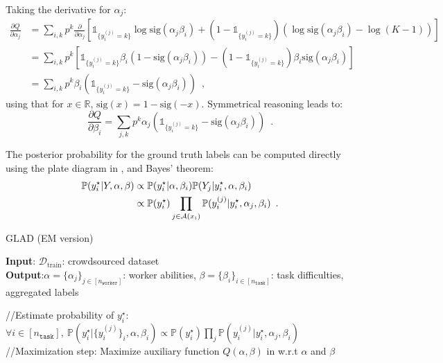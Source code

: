 Taking the derivative for $\alpha_j$:
\[
\begin{aligned}
\frac{\partial Q}{\partial \alpha_j} &= \sum_{i,k}p^k \frac{\partial}{\partial \alpha_j}\left[\mathds{1}_{\{y_i^{(j)}=k\}}\log \mathrm{sig}(\alpha_j\beta_i) + \left(1-\mathds{1}_{\{y_i^{(j)}=k\}}\right)\left(\log \mathrm{sig}(\alpha_j\beta_i) - \log(K-1)\right)\right] \\
&= \sum_{i,k}p^k \left[\mathds{1}_{\{y_i^{(j)}=k\}}\beta_i \left(1-\mathrm{sig}(\alpha_j\beta_i)\right) - \left(1-\mathds{1}_{\{y_i^{(j)}=k\}}\right) \beta_i\mathrm{sig}(\alpha_j\beta_i) \right]\\
&= \sum_{i,k}p^k\beta_i\left(\mathds{1}_{\{y_i^{(j)}=k\}} - \mathrm{sig}(\alpha_j\beta_i)\right) \enspace,
\end{aligned}
\]
using that for $x\in\mathbb{R}$, $\mathrm{sig}(x) = 1-\mathrm{sig}(-x)$.
Symmetrical reasoning leads to:
\begin{equation*}
    \frac{\partial Q}{\partial \beta_i} = \sum_{j,k}p^k\alpha_j\left(\mathds{1}_{\{y_i^{(j)}=k\}} - \mathrm{sig}(\alpha_j\beta_i)\right) \enspace.
\end{equation*}

The posterior probability for the ground truth labels can be computed directly using the plate diagram in ,  and Bayes' theorem:
\begin{align}
    \mathbb{P}(y_i^\star|Y,\alpha,\beta)&\propto \mathbb{P}(y_i^\star|\alpha,\beta_i)\mathbb{P}(Y_j|y_i^\star,\alpha,\beta_i) \notag\\
    &\propto \mathbb{P}(y_i^\star) \prod_{j\in\mathcal{A}(x_i)} \mathbb{P}(y_i^{(j)}|y_i^\star,\alpha_j,\beta_i) \enspace.
\end{align}

\begin{algorithm}[tb]
   \caption{$\mathrm{GLAD}$ (EM version)}\label{ag:GLAD}
\textbf{Input}: $\mathcal{D}_{\text{train}}$: crowdsourced dataset \\
\textbf{Output}:$\alpha=\{\alpha_j\}_{j\in [n_\texttt{worker}]}$: worker abilities, $\beta=\{\beta_i\}_{i\in [n_\texttt{task}]}$: task difficulties, aggregated labels
\begin{algorithmic}[1]
    \STATE //Estimate probability of $y_i^\star$:
    \STATE $\forall i \in [n_{\texttt{task}}],\ \mathbb{P}(y_i^\star|\{y_i^{(j)}\}_{i},\alpha,\beta_i)\propto \mathbb{P}(y_i^\star)\prod_j \mathbb{P}(y_i^{(j)}|y_i^\star,\alpha_j,\beta_i)$
    \STATE //Maximization step:
    \STATE Maximize auxiliary function $Q(\alpha,\beta)$ in  w.r.t $\alpha$ and $\beta$
\ENDWHILE
\end{algorithmic}
\end{algorithm}


